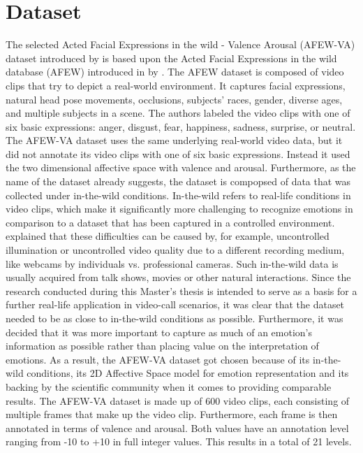 \section{Dataset}
The selected Acted Facial Expressions in the wild - Valence Arousal (AFEW-VA) dataset introduced by \citet{Kossaifi:2017:AFEW-VADatabase} is based upon the Acted Facial Expressions in the wild database (AFEW) introduced in \citeyear{Dhall:2012:AFEW} by \citet{Dhall:2012:AFEW}. The AFEW dataset is composed of video clips that try to depict a real-world environment. It captures facial expressions, natural head pose movements, occlusions, subjects' races, gender, diverse ages, and multiple subjects in a scene. The authors labeled the video clips with one of six basic expressions: anger, disgust, fear, happiness, sadness, surprise, or neutral. The AFEW-VA dataset \citep{Kossaifi:2017:AFEW-VADatabase} uses the same underlying real-world video data, but it did not annotate its video clips with one of six basic expressions. Instead it used the two dimensional affective space with valence and arousal. 
\newline\newline
Furthermore, as the name of the dataset already suggests, the dataset is compopsed of data that was collected under in-the-wild conditions. In-the-wild refers to real-life conditions in video clips, which make it significantly more challenging to recognize emotions in comparison to a dataset that has been captured in a controlled environment. \citet{Salah:2018:VideoBasedER} explained that these difficulties can be caused by, for example, uncontrolled illumination or uncontrolled video quality due to a different recording medium, like webcams by individuals vs. professional cameras. Such in-the-wild data is usually acquired from talk shows, movies or other natural interactions. 
\newline\newline
Since the research conducted during this Master's thesis is intended to serve as a basis for a further real-life application in video-call scenarios, it was clear that the dataset needed to be as close to in-the-wild conditions as possible. Furthermore, it was decided that it was more important to capture as much of an emotion's information as possible rather than placing value on the interpretation of emotions. As a result, the AFEW-VA dataset got chosen because of its in-the-wild conditions, its 2D Affective Space model for emotion representation and its backing by the scientific community when it comes to providing comparable results.
\newline\newline
The AFEW-VA dataset is made up of 600 video clips, each consisting of multiple frames that make up the video clip. Furthermore, each frame is then annotated in terms of valence and arousal. Both values have an annotation level ranging from -10 to +10 in full integer values. This results in a total of 21 levels.\citep{Kossaifi:2017:AFEW-VADatabase} 



